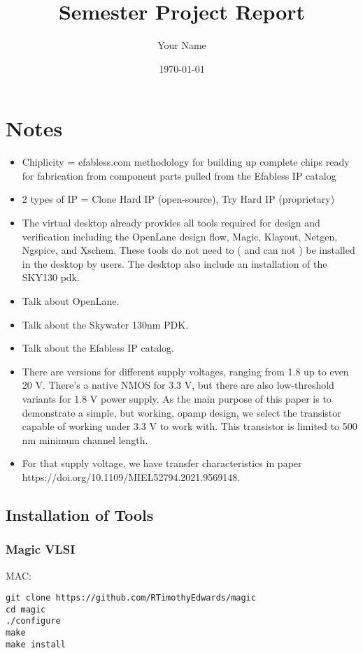 \documentclass{report}
\begin{document}
\title{Semester Project Report}
\author{Your Name}
\date{\today}

\maketitle

\chapter*{Notes}
\begin{itemize}
    \item Chiplicity = efabless.com methodology for building up complete chips ready for fabrication from component parts pulled from the Efabless IP catalog
    \item 2 types of IP = Clone Hard IP (open-source), Try Hard IP (proprietary) 
    \item The virtual desktop already provides all tools required for design and verification including the OpenLane design flow, Magic, Klayout, Netgen, Ngspice, and Xschem.  These tools do not need to ( and can not ) be installed in the desktop by users.  The  desktop also include an installation of the SKY130 pdk.
    \item Talk about OpenLane.
    \item Talk about the Skywater 130nm PDK.
    \item Talk about the Efabless IP catalog.
    \item There are versions for different supply voltages, ranging from 1.8 up to even 20 V. There’s a native NMOS for 3.3 V, but there are also low-threshold variants for 1.8 V power supply. As the main purpose of this paper is to demonstrate a simple, but working, opamp design, we select the transistor capable of working under 3.3 V to work with. This transistor is limited to 500 nm minimum channel length.
    \item For that supply voltage, we have transfer characteristics in paper https://doi.org/10.1109/MIEL52794.2021.9569148.

\end{itemize}

\section{Installation of Tools}

\subsection*{Magic VLSI}
MAC:
\begin{verbatim}
git clone https://github.com/RTimothyEdwards/magic
cd magic
./configure
make
make install
\end{verbatim}
\end{document}
